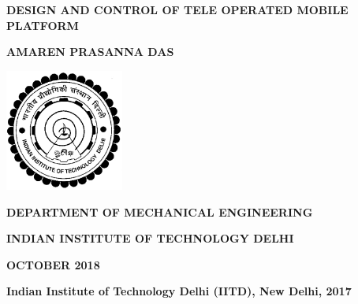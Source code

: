\doublespacing
\thispagestyle{empty}
\begin{center}



\textbf{\large{DESIGN AND CONTROL OF TELE OPERATED MOBILE PLATFORM}}

\bigskip
\bigskip
\bigskip
\bigskip
\bigskip
\bigskip
\bigskip
\bigskip
\bigskip
\bigskip

\textbf{AMAREN PRASANNA DAS}

\bigskip
\bigskip
\bigskip
\bigskip
\bigskip
\bigskip
\bigskip
\bigskip
\bigskip
\bigskip
\bigskip
\bigskip
\bigskip
\bigskip
\bigskip
\bigskip
\bigskip
\bigskip
\bigskip
\bigskip
\bigskip

\includegraphics[height=4cm]{Misc_front/iitlogo.eps}

\bigskip
\bigskip
\bigskip
\bigskip
\bigskip
\bigskip

\textbf{DEPARTMENT OF MECHANICAL ENGINEERING}

\textbf{INDIAN INSTITUTE OF TECHNOLOGY DELHI}

\textbf{OCTOBER 2018}



\end{center}
\newpage
\thispagestyle{empty}
\vspace*{\fill}
\textbf{ \textcopyright Indian Institute of Technology Delhi (IITD), New Delhi, 2017}
\vspace*{\fill}
\mbox{}

